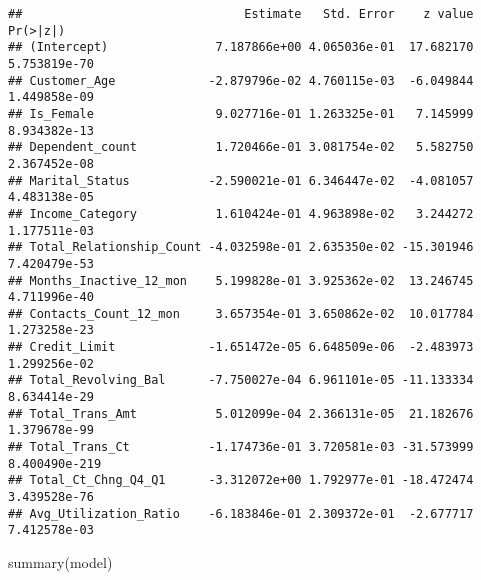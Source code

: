 \documentclass[
]{article}
\newenvironment{Shaded}{\begin{snugshade}}{\end{snugshade}}
\newcommand{\FunctionTok}[1]{\textcolor[rgb]{0.00,0.00,0.00}{#1}}
\newcommand{\NormalTok}[1]{#1}
\begin{document}
\begin{verbatim}
##                               Estimate   Std. Error    z value      Pr(>|z|)
## (Intercept)               7.187866e+00 4.065036e-01  17.682170  5.753819e-70
## Customer_Age             -2.879796e-02 4.760115e-03  -6.049844  1.449858e-09
## Is_Female                 9.027716e-01 1.263325e-01   7.145999  8.934382e-13
## Dependent_count           1.720466e-01 3.081754e-02   5.582750  2.367452e-08
## Marital_Status           -2.590021e-01 6.346447e-02  -4.081057  4.483138e-05
## Income_Category           1.610424e-01 4.963898e-02   3.244272  1.177511e-03
## Total_Relationship_Count -4.032598e-01 2.635350e-02 -15.301946  7.420479e-53
## Months_Inactive_12_mon    5.199828e-01 3.925362e-02  13.246745  4.711996e-40
## Contacts_Count_12_mon     3.657354e-01 3.650862e-02  10.017784  1.273258e-23
## Credit_Limit             -1.651472e-05 6.648509e-06  -2.483973  1.299256e-02
## Total_Revolving_Bal      -7.750027e-04 6.961101e-05 -11.133334  8.634414e-29
## Total_Trans_Amt           5.012099e-04 2.366131e-05  21.182676  1.379678e-99
## Total_Trans_Ct           -1.174736e-01 3.720581e-03 -31.573999 8.400490e-219
## Total_Ct_Chng_Q4_Q1      -3.312072e+00 1.792977e-01 -18.472474  3.439528e-76
## Avg_Utilization_Ratio    -6.183846e-01 2.309372e-01  -2.677717  7.412578e-03
\end{verbatim}

\begin{Shaded}
\begin{Highlighting}[]
\FunctionTok{summary}\NormalTok{(model)}
\end{Highlighting}
\end{Shaded}
\end{document}
